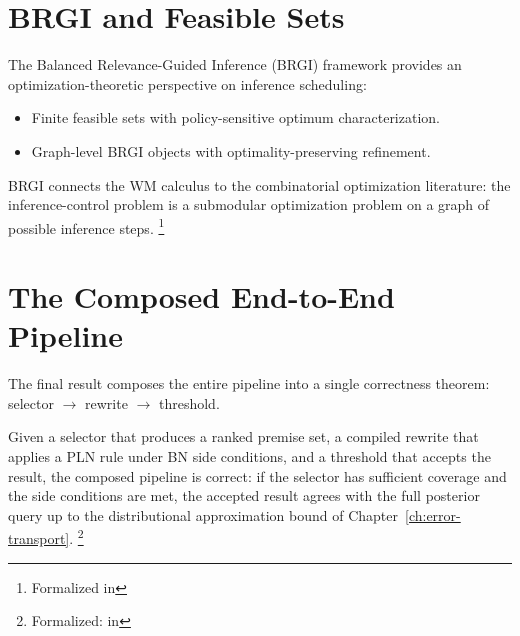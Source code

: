 \documentclass[11pt,openany]{report}
\begin{document}
\section{BRGI and Feasible Sets}

The Balanced Relevance-Guided Inference (BRGI) framework provides an
optimization-theoretic perspective on inference scheduling:
\begin{itemize}
\item Finite feasible sets with policy-sensitive optimum
  characterization.
\item Graph-level BRGI objects with optimality-preserving refinement.
\end{itemize}

\noindent
BRGI connects the WM calculus to the combinatorial optimization
literature: the inference-control problem is a submodular optimization
problem on a graph of possible inference steps.%
\footnote{Formalized in
}


\section{The Composed End-to-End Pipeline}
\label{sec:composed-pipeline}

The final result composes the entire pipeline into a single
correctness theorem: selector $\to$ rewrite $\to$ threshold.

\begin{theorem}
\label{thm:end-to-end}
Given a selector that produces a ranked premise set, a compiled
rewrite that applies a PLN rule under BN side conditions, and a
threshold that accepts the result, the composed pipeline is correct:
if the selector has sufficient coverage and the side conditions are
met, the accepted result agrees with the full posterior query up to
the distributional approximation bound of
Chapter~\ref{ch:error-transport}.%
\footnote{Formalized:
in }
\end{theorem}
\end{document}
